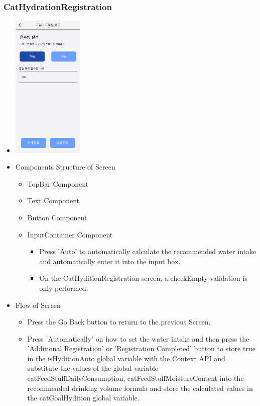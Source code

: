 \documentclass[conference]{IEEEtran}
\begin{document}
\subsubsection{CatHydrationRegistration}
\begin{itemize}
    \item[] \includegraphics[width=0.27\textwidth]{img/Screen/13_CatHydration.png}
    \item Components Structure of Screen
    \begin{itemize}
        \item TopBar Component
        \item Text Component
        \item Button Component
        \item InputContainer Component
        \begin{itemize}
            \item Press 'Auto' to automatically calculate the recommended water intake and automatically enter it into the input box.
            \item On the CatHyditionRegistration screen, a checkEmpty  validation is only performed.
        \end{itemize}
    \end{itemize}
    \item Flow of Screen
    \begin{itemize}
        \item Press the Go Back button to return to the previous Screen.
        \item Press 'Automatically' on how to set the water intake and then press the 'Additional Registration' or 'Registration Completed' button to store true in the isHyditionAuto global variable with the Context API and substitute the values of the global variable catFeedStuffDailyConsumption, catFeedStuffMoistureContent into the recommended drinking volume formula and store the calculated values in the catGoalHydition global variable.

\end{itemize}
\end{itemize}
\end{document}

